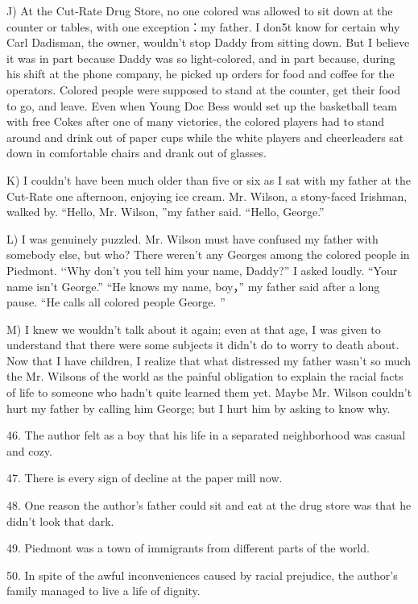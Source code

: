 \documentclass[UTF8,11pt]{ctexart}
\begin{document}
J) At the Cut-Rate Drug Store, no one colored was allowed to sit down at the counter or tables, with one exception：my father. I don5t know for certain why Carl Dadisman, the owner, wouldn’t stop Daddy from sitting down. But I believe it was in part because Daddy was so light-colored, and in part because, during his shift at the phone company, he picked up orders for food and coffee for the operators. Colored people were supposed to stand at the counter, get their food to go, and leave. Even when Young Doc Bess would set up the basketball team with free Cokes after one of many victories, the colored players had to stand around and drink out of paper cups while the white players and cheerleaders sat down in comfortable chairs and drank out of glasses.


K) I couldn’t have been much older than five or six as I sat with my father at the Cut-Rate one afternoon, enjoying ice cream. Mr. Wilson, a stony-faced Irishman, walked by. “Hello, Mr. Wilson, ”my father said. “Hello, George.”


L) I was genuinely puzzled. Mr. Wilson must have confused my father with somebody else, but who? There weren’t any Georges among the colored people in Piedmont. ‘‘Why don’t you tell him your name, Daddy?” I asked loudly. “Your name isn’t George.” “He knows my name, boy，” my father said after a long pause. “He calls all colored people George. ”


M) I knew we wouldn’t talk about it again; even at that age, I was given to understand that there were some subjects it didn’t do to worry to death about. Now that I have children, I realize that what distressed my father wasn’t so much the Mr. Wilsons of the world as the painful obligation to explain the racial facts of life to someone who hadn’t quite learned them yet. Maybe Mr. Wilson couldn’t hurt my father by calling him George; but I hurt him by asking to know why.


46. The author felt as a boy that his life in a separated neighborhood was casual and cozy.


47. There is every sign of decline at the paper mill now.


48. One reason the author’s father could sit and eat at the drug store was that he didn’t look that dark.


49. Piedmont was a town of immigrants from different parts of the world.


50. In spite of the awful inconveniences caused by racial prejudice, the author’s family managed to live a life of dignity.
\end{document}
